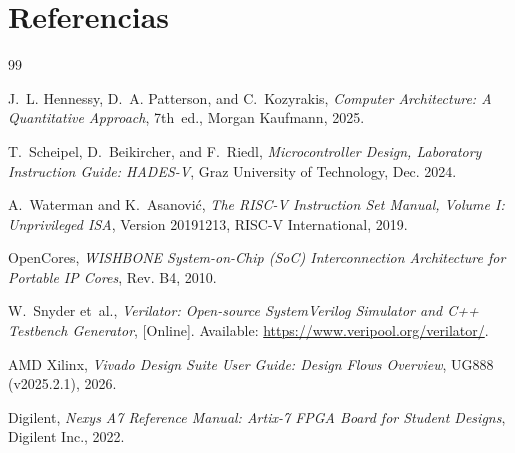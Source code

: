 \documentclass[10pt,a4paper]{article}
\begin{document}
\section{Referencias}
\renewcommand{\refname}{}

\begin{thebibliography}{99}

J.~L. Hennessy, D.~A. Patterson, and C.~Kozyrakis, \textit{Computer Architecture: A Quantitative Approach}, 7th~ed., Morgan Kaufmann, 2025.

T.~Scheipel, D.~Beikircher, and F.~Riedl, \textit{Microcontroller Design, Laboratory Instruction Guide: HADES-V}, Graz University of Technology, Dec. 2024.

A.~Waterman and K.~Asanovi\'c, \textit{The RISC-V Instruction Set Manual, Volume I: Unprivileged ISA}, Version 20191213, RISC-V International, 2019.

OpenCores, \textit{WISHBONE System-on-Chip (SoC) Interconnection Architecture for Portable IP Cores}, Rev. B4, 2010.

W.~Snyder et~al., \textit{Verilator: Open-source SystemVerilog Simulator and C++ Testbench Generator}, [Online]. Available: \url{https://www.veripool.org/verilator/}.

AMD Xilinx, \textit{Vivado Design Suite User Guide: Design Flows Overview}, UG888 (v2025.2.1), 2026.

Digilent, \textit{Nexys A7 Reference Manual: Artix-7 FPGA Board for Student Designs}, Digilent Inc., 2022.

\end{thebibliography}
\end{document}
